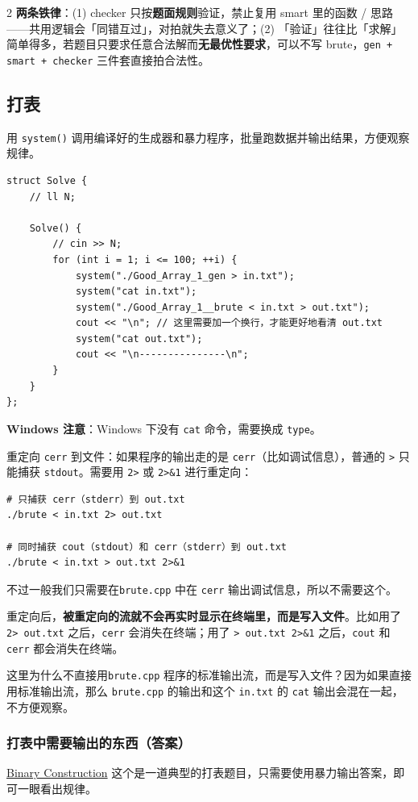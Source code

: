 \begin{multicols*}{2}
		\textbf{两条铁律}：(1) checker 只按\textbf{题面规则}验证，禁止复用 smart 里的函数 / 思路——共用逻辑会「同错互过」，对拍就失去意义了；(2) 「验证」往往比「求解」简单得多，若题目只要求任意合法解而\textbf{无最优性要求}，可以不写 brute，\texttt{gen + smart + checker} 三件套直接拍合法性。

		\subsection{打表}

		用 \texttt{system()} 调用编译好的生成器和暴力程序，批量跑数据并输出结果，方便观察规律。

		\begin{verbatim}
struct Solve {
	// ll N;

	Solve() {
		// cin >> N;
		for (int i = 1; i <= 100; ++i) {
			system("./Good_Array_1_gen > in.txt");
			system("cat in.txt");
			system("./Good_Array_1__brute < in.txt > out.txt");
			cout << "\n"; // 这里需要加一个换行，才能更好地看清 out.txt
			system("cat out.txt");
			cout << "\n---------------\n";
		}
	}
};
		\end{verbatim}

		\textbf{Windows 注意}：Windows 下没有 \texttt{cat} 命令，需要换成 \texttt{type}。

		重定向 \texttt{cerr} 到文件：如果程序的输出走的是 \texttt{cerr}（比如调试信息），普通的 \texttt{>} 只能捕获 \texttt{stdout}。需要用 \texttt{2>} 或 \texttt{2>\&1} 进行重定向：

		\begin{verbatim}
# 只捕获 cerr（stderr）到 out.txt
./brute < in.txt 2> out.txt

# 同时捕获 cout（stdout）和 cerr（stderr）到 out.txt
./brute < in.txt > out.txt 2>&1
		\end{verbatim}

		不过一般我们只需要在\texttt{brute.cpp} 中在 \texttt{cerr} 输出调试信息，所以不需要这个。

		重定向后，\textbf{被重定向的流就不会再实时显示在终端里，而是写入文件}。比如用了 \texttt{2> out.txt} 之后，\texttt{cerr} 会消失在终端；用了 \texttt{> out.txt 2>\&1} 之后，\texttt{cout} 和 \texttt{cerr} 都会消失在终端。

		这里为什么不直接用\texttt{brute.cpp} 程序的标准输出流，而是写入文件？因为如果直接用标准输出流，那么 \texttt{brute.cpp} 的输出和这个 \texttt{in.txt} 的 \texttt{cat} 输出会混在一起，不方便观察。

		\subsubsection{打表中需要输出的东西（答案）}
		\href{https://www.codechef.com/problems/BINCON}{Binary Construction} 这个是一道典型的打表题目，只需要使用暴力输出答案，即可一眼看出规律。


\end{multicols*}
